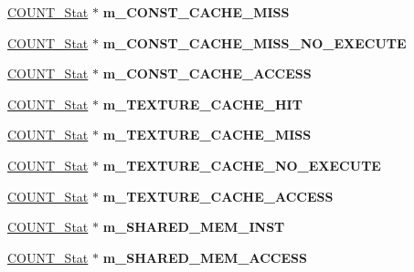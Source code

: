 \begin{DoxyCompactItemize}
\item 
\hypertarget{classall__stats__c_a8331696eb277b7759b5b030d18bf2314}{
\hyperlink{classCOUNT__Stat}{COUNT\_\-Stat} $\ast$ {\bfseries m\_\-CONST\_\-CACHE\_\-MISS}}
\label{classall__stats__c_a8331696eb277b7759b5b030d18bf2314}

\item 
\hypertarget{classall__stats__c_a05d423c6bbb0ba9376520dc0e70fe261}{
\hyperlink{classCOUNT__Stat}{COUNT\_\-Stat} $\ast$ {\bfseries m\_\-CONST\_\-CACHE\_\-MISS\_\-NO\_\-EXECUTE}}
\label{classall__stats__c_a05d423c6bbb0ba9376520dc0e70fe261}

\item 
\hypertarget{classall__stats__c_a779761611656e68f1c4c1673a2a19dcc}{
\hyperlink{classCOUNT__Stat}{COUNT\_\-Stat} $\ast$ {\bfseries m\_\-CONST\_\-CACHE\_\-ACCESS}}
\label{classall__stats__c_a779761611656e68f1c4c1673a2a19dcc}

\item 
\hypertarget{classall__stats__c_aec6f8fb96bd24945e83386b7304a4829}{
\hyperlink{classCOUNT__Stat}{COUNT\_\-Stat} $\ast$ {\bfseries m\_\-TEXTURE\_\-CACHE\_\-HIT}}
\label{classall__stats__c_aec6f8fb96bd24945e83386b7304a4829}

\item 
\hypertarget{classall__stats__c_a9e1ee7089bd0fbe23d9a354b08d0bbe3}{
\hyperlink{classCOUNT__Stat}{COUNT\_\-Stat} $\ast$ {\bfseries m\_\-TEXTURE\_\-CACHE\_\-MISS}}
\label{classall__stats__c_a9e1ee7089bd0fbe23d9a354b08d0bbe3}

\item 
\hypertarget{classall__stats__c_ae308db47341eb71261792752af9c53ab}{
\hyperlink{classCOUNT__Stat}{COUNT\_\-Stat} $\ast$ {\bfseries m\_\-TEXTURE\_\-CACHE\_\-NO\_\-EXECUTE}}
\label{classall__stats__c_ae308db47341eb71261792752af9c53ab}

\item 
\hypertarget{classall__stats__c_a0751d348d52614186937c1273c061672}{
\hyperlink{classCOUNT__Stat}{COUNT\_\-Stat} $\ast$ {\bfseries m\_\-TEXTURE\_\-CACHE\_\-ACCESS}}
\label{classall__stats__c_a0751d348d52614186937c1273c061672}

\item 
\hypertarget{classall__stats__c_a2508550cffb590ee7e091759b3b6f290}{
\hyperlink{classCOUNT__Stat}{COUNT\_\-Stat} $\ast$ {\bfseries m\_\-SHARED\_\-MEM\_\-INST}}
\label{classall__stats__c_a2508550cffb590ee7e091759b3b6f290}

\item 
\hypertarget{classall__stats__c_ab2480cf09a5a482acf7822b6f803737b}{
\hyperlink{classCOUNT__Stat}{COUNT\_\-Stat} $\ast$ {\bfseries m\_\-SHARED\_\-MEM\_\-ACCESS}}
\label{classall__stats__c_ab2480cf09a5a482acf7822b6f803737b}


\end{DoxyCompactItemize}
